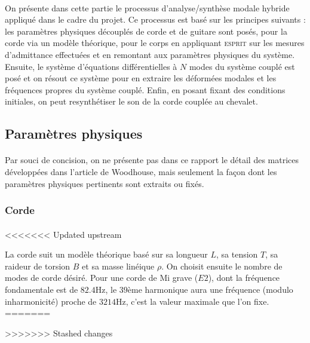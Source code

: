 \paragraph{}
  On présente dans cette partie le processus d'analyse/synthèse modale hybride
appliqué dans le cadre du projet. Ce processus est basé sur les principes
suivants : les paramètres physiques découplés de corde et de guitare sont
posés, pour la corde via un modèle théorique, pour le corps en appliquant
\textsc{esprit} sur les mesures d'admittance effectuées et en remontant aux
paramètres physiques du système.
  Ensuite, le système d'équations différentielles à \( N \) modes du système
couplé est posé et on résout ce système pour en extraire les déformées modales
et les fréquences propres du système couplé. Enfin, en posant fixant des
conditions initiales, on peut resynthétiser le son de la corde couplée au
chevalet.

\subsection{Paramètres physiques}

\paragraph{}
Par souci de concision, on ne présente pas dans ce rapport le détail des
matrices développées dans l'article de Woodhouse, mais seulement la façon dont
les paramètres physiques pertinents sont extraits ou fixés.

\subsubsection{Corde}
  \paragraph{}
<<<<<<< Updated upstream
  
  La corde suit un modèle théorique basé sur sa longueur \( L \), sa tension
\( T \), sa raideur de torsion \( B \) et sa masse linéique \( \rho{} \).
  On choisit ensuite le nombre de modes de corde désiré.
  Pour une corde de Mi grave (\( E2 \)), dont la fréquence fondamentale est
de \( \si{82.4 \hertz}\), le \( 39 \)ème harmonique aura une fréquence (modulo 
inharmonicité) proche de \( \si{3214\hertz} \), c'est la valeur maximale que
l'on fixe.
=======

>>>>>>> Stashed changes

